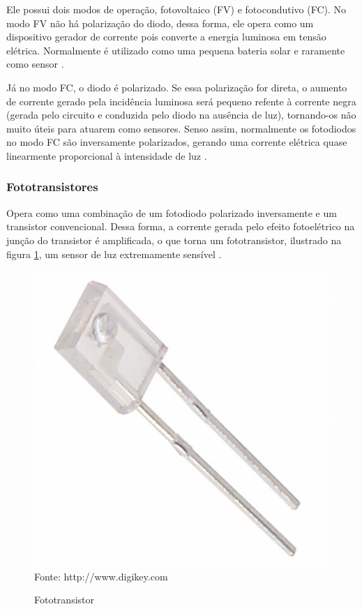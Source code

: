 Ele possui dois modos de operação, fotovoltaico (FV) e fotocondutivo (FC). No modo FV não há polarização do
diodo, dessa forma, ele opera como um dispositivo gerador de corrente pois converte a energia luminosa em
tensão elétrica. Normalmente é utilizado como uma pequena bateria solar e raramente como sensor \cite{fraden2010}.

Já no modo FC, o diodo é polarizado. Se essa polarização for direta, o aumento de corrente gerado pela
incidência luminosa será pequeno refente à corrente negra (gerada pelo circuito e conduzida pelo diodo na
ausência de luz), tornando-os não muito úteis para atuarem como sensores. Senso assim, normalmente os
fotodiodos no modo FC são inversamente polarizados, gerando uma corrente elétrica quase linearmente
proporcional à intensidade de luz \cite{dado_fischer2007}.

\subsubsection{Fototransistores}
Opera como uma combinação de um fotodiodo polarizado inversamente e um transistor convencional. Dessa forma, a
corrente gerada pelo efeito fotoelétrico na junção do transistor é amplificada, o que torna um fototransistor,
ilustrado na figura \ref{figura:phototransistor},  um sensor de luz extremamente sensível
\cite{dado_fischer2007}.

\begin{figure}[h]
	\caption{Fototransistor}
	\centering
	\includegraphics[scale=0.2]{../images/phototransistor.jpg}
	\hspace{\linewidth}
	Fonte: http://www.digikey.com
	\label{figura:phototransistor}
\end{figure}

